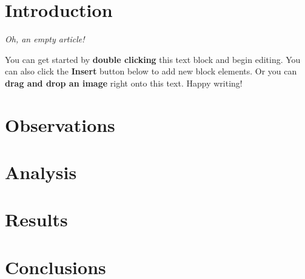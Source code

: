 \section{Introduction}


\textit{Oh, an empty article!} 



You can get started by \textbf{double clicking} this text block and begin editing. You can also click the \textbf{Insert} button below to add new block elements. Or you can \textbf{drag and drop an image} right onto this text. Happy writing!

\section{Observations}

\section{Analysis}

\section{Results}


\section{Conclusions}


